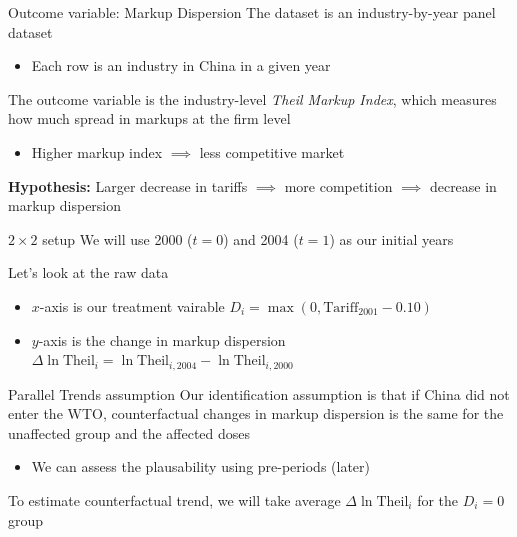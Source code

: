\documentclass[aspectratio=169,t]{beamer}
\begin{document}
\begin{frame}{Outcome variable: Markup Dispersion}
  The dataset is an industry-by-year panel dataset
  \begin{itemize}
    \item Each row is an industry in China in a given year
  \end{itemize}

  \bigskip
  The outcome variable is the industry-level \emph{Theil Markup Index}, which measures how much spread in markups at the firm level
  \begin{itemize}
    \item Higher markup index $\implies$ less competitive market
  \end{itemize}

  \pause
  \bigskip
  \textbf{Hypothesis:} Larger decrease in tariffs $\implies$ more competition $\implies$ decrease in markup dispersion
\end{frame}

\begin{frame}{$2 \times 2$ setup}
  We will use 2000 ($t = 0$) and 2004 ($t = 1$) as our initial years

  \bigskip
  Let's look at the raw data
  \begin{itemize}
    \item $x$-axis is our treatment vairable $D_i = \max (0, \text{Tariff}_{2001} - 0.10)$

    \item $y$-axis is the change in markup dispersion $\Delta \ln \text{Theil}_i = \ln \text{Theil}_{i, 2004} - \ln \text{Theil}_{i, 2000}$
  \end{itemize}
\end{frame}


\begin{frame}{Parallel Trends assumption}
  Our identification assumption is that if China did not enter the WTO, counterfactual changes in markup dispersion is the same for the unaffected group and the affected doses

  \begin{itemize}
    \item We can assess the plausability using pre-periods (later)
  \end{itemize}

  \pause
  \bigskip\bigskip
  To estimate counterfactual trend, we will take average $\Delta \ln \text{Theil}_i$ for the $D_i = 0$ group
\end{frame}
\end{document}
